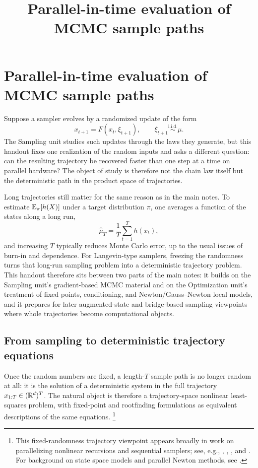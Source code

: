 \documentclass[11pt]{article}
\title{Parallel-in-time evaluation of MCMC sample paths}
\author{}
\date{}
\begin{document}
\maketitle

\section[Parallel-in-time MCMC]{Parallel-in-time evaluation of MCMC sample paths}
\label{sec:parallel-mcmc}

Suppose a sampler evolves by a randomized update of the form
\[
x_{t+1}=F(x_t,\xi_{t+1}),
\qquad
\xi_{t+1}\stackrel{\text{i.i.d.}}{\sim}\mu.
\]
The Sampling unit studies such updates through the laws they generate, but this handout fixes one realization of the random inputs and asks a different question: can the resulting trajectory be recovered faster than one step at a time on parallel hardware?
The object of study is therefore not the chain law itself but the deterministic path in the product space of trajectories.

Long trajectories still matter for the same reason as in the main notes.
To estimate $\mathbb{E}_\pi[h(X)]$ under a target distribution $\pi$, one averages a function of the states along a long run,
\[
\hat{\mu}_T = \frac{1}{T}\sum_{t=1}^T h(x_t),
\]
and increasing $T$ typically reduces Monte Carlo error, up to the usual issues of burn-in and dependence.
For Langevin-type samplers, freezing the randomness turns that long-run sampling problem into a deterministic trajectory problem.
This handout therefore sits between two parts of the main notes: it builds on the Sampling unit's gradient-based MCMC material and on the Optimization unit's treatment of fixed points, conditioning, and Newton/Gauss--Newton local models, and it prepares for later augmented-state and bridge-based sampling viewpoints where whole trajectories become computational objects.

\subsection{From sampling to deterministic trajectory equations}
\label{subsec:fixed-point}

Once the random numbers are fixed, a length-$T$ sample path is no longer random at all: it is the solution of a deterministic system in the full trajectory $x_{1:T}\in(\mathbb{R}^d)^T$.
The natural object is therefore a trajectory-space nonlinear least-squares problem, with fixed-point and rootfinding formulations as equivalent descriptions of the same equations.
\footnote{This fixed-randomness trajectory viewpoint appears broadly in work on parallelizing nonlinear recursions and sequential samplers; see, e.g., \citet[\S2]{zoltowski_wu_gonzalez_kozachkov_linderman_2025_parallel_mcmc_sequence_length}, \citet[\S3]{shih_belkhale_ermon_sadigh_anari_2023_parallel_sampling_diffusion}, \citet[\S3]{lim_zhu_selfridge_kasim_2024_parallelizing_nonlinear_sequential_models}, and \citet[\S1]{gonzalez_warrington_smith_linderman_2024_towards_scalable_stable_parallelization_nonlinear_rnns}. For background on state space models and parallel Newton methods, see \citet[Ch.~2]{gonzalez_2026_parallelizing_inherently_sequential_processes_thesis}.}
\end{document}
